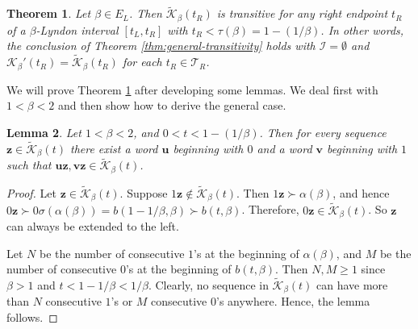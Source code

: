 \documentclass[11pt]{amsart}
\newtheorem{theorem}{Theorem}[section]
\newtheorem{lemma}[theorem]{Lemma}
\theoremstyle{definition}
\newtheorem{definition}[theorem]{Definition}
\theoremstyle{remark}
\numberwithin{equation}{section}
\newcommand{\N}{\ensuremath{\mathbb{N}}}
\newcommand{\II}{\mathcal{I}}
\newcommand{\Kt}{\widetilde{\mathcal{K}}}
\renewcommand{\u}{\mathbf{u}}
\renewcommand{\v}{\mathbf{v}}
\newcommand{\z}{\mathbf{z}}
\newcommand{\al}{\alpha}
\newcommand{\si}{\sigma}
\begin{document}
\begin{theorem} \label{thm:transitive-in-E_L}
Let $\beta\in E_L$. Then $\Kt_\beta(t_R)$ is transitive for any right endpoint $t_R$ of a $\beta$-Lyndon interval $[t_L,t_R]$ with $t_R<\tau(\beta)=1-(1/\beta)$. In other words, the conclusion of Theorem \ref{thm:general-transitivity} holds with $\II=\emptyset$ and $\mathcal{K}_\beta'(t_R)=\Kt_\beta(t_R)$ for each $t_R\in\mathcal{T}_R$.
\end{theorem}

We will prove Theorem \ref{thm:transitive-in-E_L} after developing some lemmas. {We deal first with $1<\beta<2$ and then show how to derive the general case.}


\begin{lemma} \label{lem:extensibility}
Let $1<\beta<2$, and $0<t<1-(1/\beta)$. Then for every sequence $\z\in \Kt_\beta(t)$ there exist a word $\u$ beginning with $0$ and a word $\v$ beginning with $1$ such that $\u\z, \v\z \in \Kt_\beta(t)$.
\end{lemma}


\begin{proof}
Let $\z\in\Kt_\beta(t)$. Suppose $1\z\not\in\Kt_\beta(t)$. Then $1\z\succ\al(\beta)$, and hence $0\z\succ 0\si(\al(\beta))=b(1-1/\beta,\beta)\succ b(t,\beta)$. Therefore, $0\z\in\Kt_\beta(t)$. So $\z$ can always be extended to the left.

Let $N$ be the number of consecutive $1$'s at the beginning of $\al(\beta)$, and $M$ be the number of consecutive $0$'s at the beginning of $b(t,\beta)$. Then $N,M\geq 1$ since $\beta>1$ and $t<1-1/\beta<1/\beta$. Clearly, no sequence in $\Kt_\beta(t)$  can have more than $N$ consecutive $1$'s or $M$ consecutive $0$'s anywhere. Hence, the lemma follows.
\end{proof}
\end{document}
